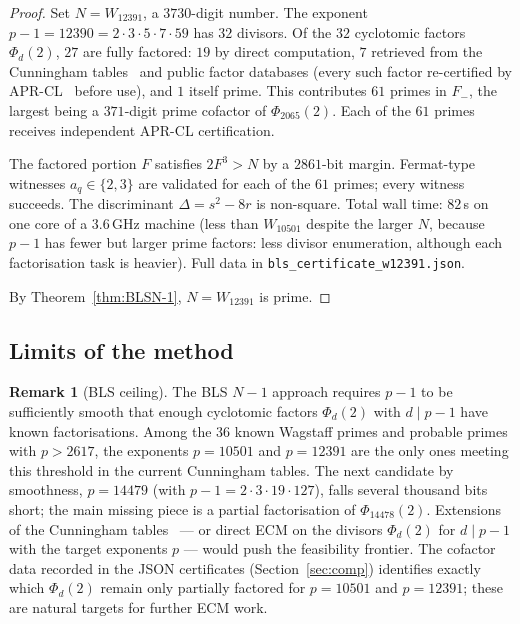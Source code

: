 \documentclass[11pt,a4paper]{amsart}
\theoremstyle{plain}
\theoremstyle{definition}
\newtheorem{remark}[theorem]{Remark}
\begin{document}
\begin{proof}
Set $N = W_{12391}$, a $3730$-digit number. The exponent $p - 1 =
12390 = 2 \cdot 3 \cdot 5 \cdot 7 \cdot 59$ has $32$ divisors. Of the
$32$ cyclotomic factors $\Phi_d(2)$, $27$ are fully factored: $19$
by direct computation, $7$ retrieved from the Cunningham
tables~\cite{Cunningham} and public factor databases (every such
factor re-certified by APR-CL~\cite{APR,CohenLenstra} before use),
and $1$ itself prime. This contributes $61$ primes in $F_-$, the
largest being a $371$-digit prime cofactor of $\Phi_{2065}(2)$. Each
of the $61$ primes receives independent APR-CL certification.

The factored portion $F$ satisfies $2 F^3 > N$ by a $2861$-bit
margin. Fermat-type witnesses $a_q \in \{2, 3\}$ are validated for
each of the $61$ primes; every witness succeeds. The discriminant
$\Delta = s^2 - 8r$ is non-square. Total wall time: $82$\,s on one
core of a 3.6\,GHz machine (less than $W_{10501}$ despite the larger
$N$, because $p - 1$ has fewer but larger prime factors: less
divisor enumeration, although each factorisation task is heavier).
Full data in \texttt{bls\_certificate\_w12391.json}.

By Theorem~\ref{thm:BLSN-1}, $N = W_{12391}$ is prime.
\end{proof}

\subsection{Limits of the method}

\begin{remark}[BLS ceiling]
\label{rem:bls-ceiling}
The BLS $N - 1$ approach requires $p - 1$ to be sufficiently smooth
that enough cyclotomic factors $\Phi_d(2)$ with $d \mid p - 1$ have
known factorisations. Among the $36$ known Wagstaff primes and
probable primes with $p > 2617$, the exponents $p = 10501$ and
$p = 12391$ are the only ones meeting this threshold in the current
Cunningham tables. The next candidate by smoothness, $p = 14479$
(with $p - 1 = 2 \cdot 3 \cdot 19 \cdot 127$), falls several thousand
bits short; the main missing piece is a partial factorisation of
$\Phi_{14478}(2)$. Extensions of the Cunningham
tables~\cite{Cunningham} --- or direct ECM on the divisors
$\Phi_d(2)$ for $d \mid p - 1$ with the target exponents $p$ ---
would push the feasibility frontier. The cofactor data recorded in
the JSON certificates (Section~\ref{sec:comp}) identifies exactly
which $\Phi_d(2)$ remain only partially factored for $p = 10501$ and
$p = 12391$; these are natural targets for further ECM work.
\end{remark}
\end{document}
